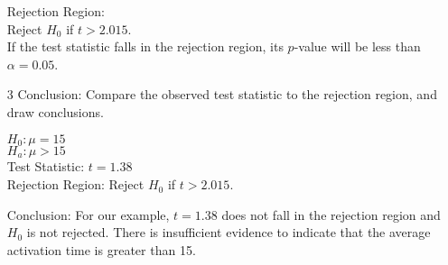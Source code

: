 \documentclass[12pt, letterpaper]{article}
\begin{document}
\begin{itemize}
\begin{mdframed}[leftmargin=0.5cm, rightmargin=0.5cm]
\begin{center}
\begin{equation*}
                            \end{equation*}
                            Rejection Region: \\
                            Reject $H_0$ if $t > 2.015$. \\
                            If the test statistic falls in the rejection region, its $p$-value will be less than $\alpha = 0.05$.
                        \end{center}
                    \end{mdframed}
                    \newpage
                    \item[3] Conclusion: Compare the observed test statistic to the rejection region, and draw conclusions.
                    \begin{mdframed}[leftmargin=0.5cm, rightmargin=0.5cm]
                        \begin{center}
                            $H_0: \mu = 15$ \\ 
                            $H_a: \mu > 15$ \\
                            Test Statistic: $t = 1.38$ \\
                            Rejection Region: Reject $H_0$ if $t > 2.015$.
                        \end{center}
                    \end{mdframed}
                    Conclusion: For our example, $t = 1.38$ does not fall in the rejection region and $H_0$ is not rejected. There is insufficient evidence to indicate that the average activation time is greater than 15.
                \end{itemize}
\end{document}
